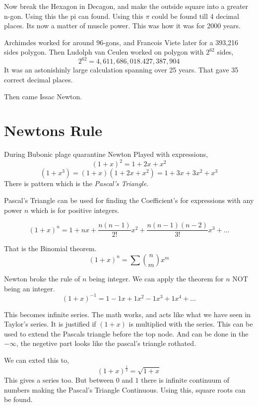\documentclass[a4paper, 11pt,twoside]{memoir}
\begin{document}
    Now break the Hexagon in Decagon, and make the outside square into a greater n-gon. Using  this the pi can found. Using this $\pi$ could be found till 4 decimal places. Its now a matter of muscle power. This was how it was  for 2000 years. 

        Archimdes worked for around 96-gons, and Francois Viete later for a 393,216 sides polygon. Then Ludolph van Ceulen worked on polygon with $2^{62}$ sides,
        \[ 
        2^{62}=4,611,686,018.427,387,904
        \]
        It was an astonishinly large calculation spanning over 25 years. That gave 35 correct decimal places. 

        Then came Issac Newton.

        \section{ Newtons Rule }
        During Bubonic plage quarantine Newton Played with expressions,
        \[ 
            (1+x)^2 = 1 + 2x + x^2
        \]
        \[ 
            \left( 1+ x^3 \right) = \left( 1+x \right) \left( 1 + 2x + x^2 \right) =1 + 3x +3x^2 + x^3
        \]
        There is pattern which is the \emph{Pascal's Triangle}. 

        Pascal's Triangle can be used for finding the Coefficient's for expressions with any power $n$ which is for positive integers. 

        \[ 
            \left( 1+ x \right) ^{n} = 1 + nx + \frac{n \left( n - 1 \right) }{2!} x^2  + \frac{n \left( n-1 \right) \left( n-2 \right) }{3!} x^3 + \ldots
        \]

        That is the Binomial theorem.
        \[ 
            (1+x)^{ n } = \sum \binom{ n }{ m } x^m
        \]

        Newton broke the rule of $n$ being integer. We can apply the theorem for $n$ NOT being an integer.
        \[ 
            (1+x)^{ -1 } = 1 - 1x + 1x^2 - 1x^3 + 1x^{4}+ \ldots
        \]
    

        This becomes infinite series. The math works, and acts like what we have seen in  Taylor's series. It is justified if $\left( 1+x \right) $ is multiplied with the series.
        This can be used to extend the Pascals triangle before the top node. And can be done in the $-\infty$, the negetive part looks like the pascal's triangle rothated.

        We can exted this to,
        \[ 
            \left( 1 + x \right) ^{\frac{1}{2}} = \sqrt{1 + x} 
        \]
        This gives a series too. But between $0$ and $1$ there is infinite continuum of numbers making the Pascal's Triangle Continuous. Using this, square roots can be found.
\end{document}
